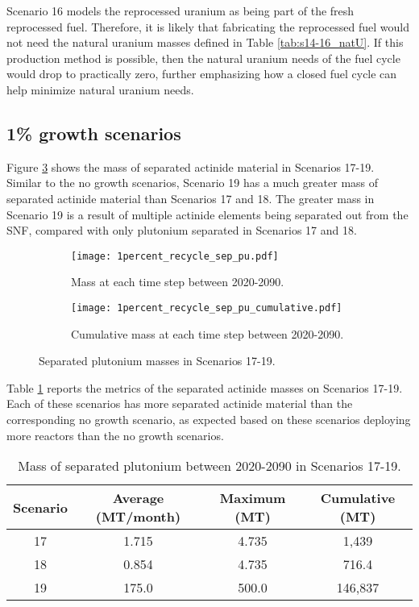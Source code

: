 Scenario 16 models the reprocessed uranium as being part of 
the fresh reprocessed fuel. Therefore, it is likely that 
fabricating the reprocessed fuel would not need the natural
uranium masses defined in Table \ref{tab:s14-16_natU}. If this 
production method is possible, then the natural uranium needs 
of the fuel cycle would drop to practically zero, further 
emphasizing how a closed fuel cycle can help minimize
natural uranium needs. 

\subsection{1\% growth scenarios}
Figure \ref{fig:1percent_recycle_sep_pu} shows the mass of separated 
actinide material in Scenarios 17-19. Similar to the no growth 
scenarios, Scenario 19 has a much greater mass of separated 
actinide material than Scenarios 17 and 18. The greater mass in 
Scenario 19 is a result of multiple actinide elements being 
separated out from the \gls{SNF}, compared with only 
plutonium separated in Scenarios 17 and 18. 

\begin{figure}[h!]
    \centering
    \begin{subfigure}[b]{0.49\textwidth}
        \centering
        \texttt{[image: 1percent\_recycle\_sep\_pu.pdf]}
        \caption{Mass 
        at each time step between 2020-2090.}
        \label{fig:1percent_recycle_sep_pu_all}
    \end{subfigure}
    \hfill
    \begin{subfigure}[b]{0.49\textwidth}
        \centering
        \texttt{[image: 1percent\_recycle\_sep\_pu\_cumulative.pdf]}
        \caption{Cumulative mass 
        at each time step between 2020-2090.}
        \label{fig:1percent_recycle_sep_pu_cumulative}
    \end{subfigure}
       \caption{Separated plutonium masses in Scenarios 17-19.}
       \label{fig:1percent_recycle_sep_pu}
\end{figure}

Table \ref{tab:s17-19_sep_pu} reports the metrics of the separated 
actinide masses on Scenarios 17-19. Each of these scenarios has more 
separated actinide material than the corresponding 
no growth scenario, as expected based on these scenarios deploying 
more reactors than the no growth scenarios. 

\begin{table}[h!]
    \centering 
    \caption{Mass of separated plutonium between 2020-2090 in Scenarios 
    17-19.}
    \label{tab:s17-19_sep_pu}
    \begin{tabular}{c c c c}
        \hline 
        Scenario & Average (MT/month) & Maximum (MT) & Cumulative (MT) \\
        \hline
        17 & 1.715 & 4.735 & 1,439\\
        18 & 0.854 & 4.735 & 716.4\\
        19 & 175.0 & 500.0 & 146,837\\
        \hline
    \end{tabular}
\end{table}

